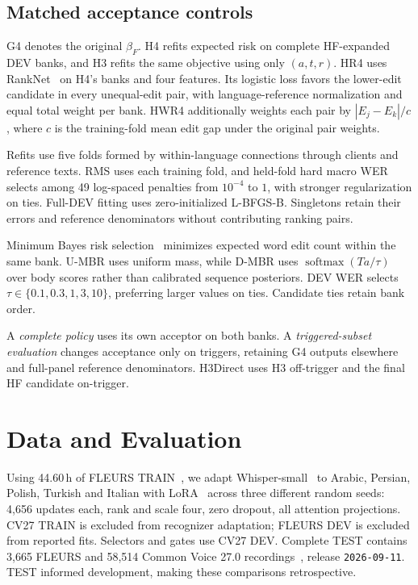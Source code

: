 \documentclass[conference,letterpaper]{IEEEtran}
\begin{document}
\subsection{Matched acceptance controls}
G4 denotes the original $\beta_F$. H4 refits expected risk on complete HF-expanded DEV banks, and H3 refits the same objective using only $(a,t,r)$. HR4 uses RankNet~\cite{ranknet2005} on H4's banks and four features. Its logistic loss favors the lower-edit candidate in every unequal-edit pair, with language-reference normalization and equal total weight per bank. HWR4 additionally weights each pair by $|E_j-E_k|/c$, where $c$ is the training-fold mean edit gap under the original pair weights.

Refits use five folds formed by within-language connections through clients and reference texts. RMS uses each training fold, and held-fold hard macro WER selects among 49 log-spaced penalties from $10^{-4}$ to $1$, with stronger regularization on ties. Full-DEV fitting uses zero-initialized L-BFGS-B. Singletons retain their errors and reference denominators without contributing ranking pairs.

Minimum Bayes risk selection~\cite{goel2000mbr} minimizes expected word edit count within the same bank. U-MBR uses uniform mass, while D-MBR uses $\operatorname{softmax}(Ta/\tau)$ over body scores rather than calibrated sequence posteriors. DEV WER selects $\tau\in\{0.1,0.3,1,3,10\}$, preferring larger values on ties. Candidate ties retain bank order.

A \emph{complete policy} uses its own acceptor on both banks. A \emph{triggered-subset evaluation} changes acceptance only on triggers, retaining G4 outputs elsewhere and full-panel reference denominators. H3Direct uses H3 off-trigger and the final HF candidate on-trigger.

\section{Data and Evaluation}
Using 44.60\,h of FLEURS TRAIN~\cite{fleurs}, we adapt Whisper-small~\cite{whisper} to Arabic, Persian, Polish, Turkish and Italian with LoRA~\cite{lora} across three different random seeds: 4,656 updates each, rank and scale four, zero dropout, all attention projections. CV27 TRAIN is excluded from recognizer adaptation; FLEURS DEV is excluded from reported fits. Selectors and gates use CV27 DEV. Complete TEST contains 3,665 FLEURS and 58,514 Common Voice 27.0 recordings~\cite{cv2020}, release \texttt{2026-09-11}. TEST informed development, making these comparisons retrospective.
\end{document}
